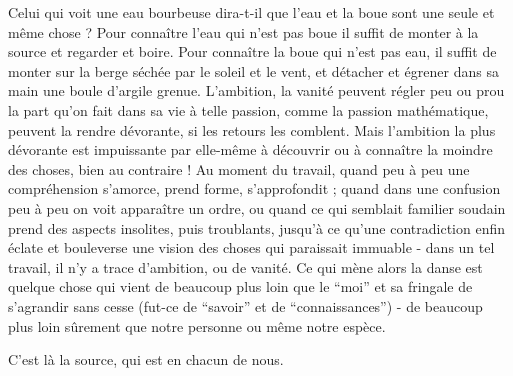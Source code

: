 Celui qui voit une eau bourbeuse dira-t-il que l'eau et la boue sont une seule et même chose ? Pour connaître l'eau qui n'est pas boue il suffit de monter à la source et regarder et boire. Pour connaître la boue qui n'est pas eau, il suffit de monter sur la berge séchée par le soleil et le vent, et détacher et égrener dans sa main une boule d'argile grenue. L'ambition, la vanité peuvent régler peu ou prou la part qu'on fait dans sa vie à telle passion, comme la passion mathématique, peuvent la rendre dévorante, si les retours les comblent. Mais l'ambition la plus dévorante est impuissante par elle-même à découvrir ou à connaître la moindre des choses, bien au contraire ! Au moment du travail, quand peu à peu une compréhension s'amorce, prend forme, s'approfondit ; quand dans une confusion peu à peu on voit apparaître un ordre, ou quand ce qui semblait familier soudain prend des aspects insolites, puis troublants, jusqu'à ce qu'une contradiction enfin éclate et bouleverse une vision des choses qui paraissait immuable - dans un tel travail, il n'y a trace d'ambition, ou de vanité. Ce qui mène alors la danse est quelque chose qui vient de beaucoup plus loin que le ``moi'' et sa fringale de s'agrandir sans cesse (fut-ce de ``savoir'' et de ``connaissances'') - de beaucoup plus loin sûrement que notre personne ou même notre espèce.

C'est là la source, qui est en chacun de nous.